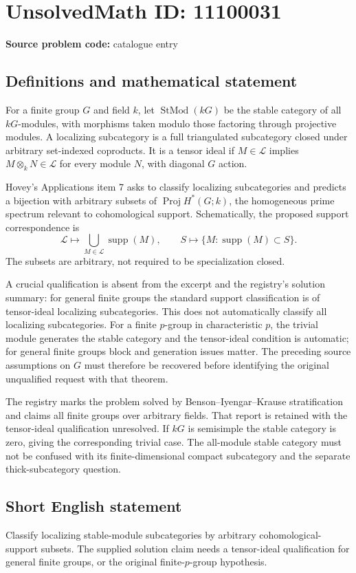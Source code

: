 \documentclass[11pt]{article}
\begin{document}
\section*{UnsolvedMath ID: 11100031}
\textbf{Source problem code:} catalogue entry
\subsection{Definitions and mathematical statement}
For a finite group $G$ and field $k$, let $\operatorname{StMod}(kG)$ be the stable category of all $kG$-modules, with morphisms taken modulo those factoring through projective modules. A localizing subcategory is a full triangulated subcategory closed under arbitrary set-indexed coproducts. It is a tensor ideal if $M\in\mathcal L$ implies $M\otimes_k N\in\mathcal L$ for every module $N$, with diagonal $G$ action.

Hovey's Applications item 7 asks to classify localizing subcategories and predicts a bijection with arbitrary subsets of $\operatorname{Proj}H^*(G;k)$, the homogeneous prime spectrum relevant to cohomological support. Schematically, the proposed support correspondence is
\[
 \mathcal L\longmapsto\bigcup_{M\in\mathcal L}\operatorname{supp}(M),
 \qquad
 S\longmapsto\{M:\operatorname{supp}(M)\subset S\}.
\]
The subsets are arbitrary, not required to be specialization closed.

A crucial qualification is absent from the excerpt and the registry's solution summary: for general finite groups the standard support classification is of tensor-ideal localizing subcategories. This does not automatically classify all localizing subcategories. For a finite $p$-group in characteristic $p$, the trivial module generates the stable category and the tensor-ideal condition is automatic; for general finite groups block and generation issues matter. The preceding source assumptions on $G$ must therefore be recovered before identifying the original unqualified request with that theorem.

The registry marks the problem solved by Benson--Iyengar--Krause stratification and claims all finite groups over arbitrary fields. That report is retained with the tensor-ideal qualification unresolved. If $kG$ is semisimple the stable category is zero, giving the corresponding trivial case. The all-module stable category must not be confused with its finite-dimensional compact subcategory and the separate thick-subcategory question.
\subsection{Short English statement}
Classify localizing stable-module subcategories by arbitrary cohomological-support subsets. The supplied solution claim needs a tensor-ideal qualification for general finite groups, or the original finite-$p$-group hypothesis.
\end{document}
